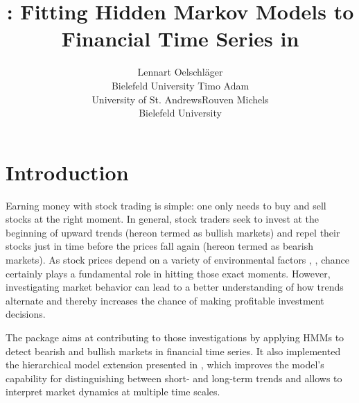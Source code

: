 \documentclass[article]{jss}
\author{Lennart Oelschl\"ager \\Bielefeld University \And Timo Adam \\University of St. Andrews\And Rouven Michels \\Bielefeld University}
\title{\pkg{fHMM}: Fitting Hidden Markov Models to Financial Time Series in \proglang{R}}
\newcommand{\fct}[1]{\code{#1()}}
\begin{document}



\section{Introduction}
\label{sec:intro} %

Earning money with stock trading is simple: one only needs to buy and sell stocks at the right moment. In general, stock traders seek to invest at the beginning of upward trends (hereon termed as bullish markets) and repel their stocks just in time before the prices fall again (hereon termed as bearish markets). As stock prices depend on a variety of environmental factors \cite{hum09}, \cite{coh13}, chance certainly plays a fundamental role in hitting those exact moments. However, investigating market behavior can lead to a better understanding of how trends alternate and thereby increases the chance of making profitable investment decisions. 

The  package aims at contributing to those investigations by applying HMMs to detect bearish and bullish markets in financial time series. It also implemented the hierarchical model extension presented in \cite{oel21}, which improves the model's capability for distinguishing between short- and long-term trends and allows to interpret market dynamics at multiple time scales.
\end{document}
